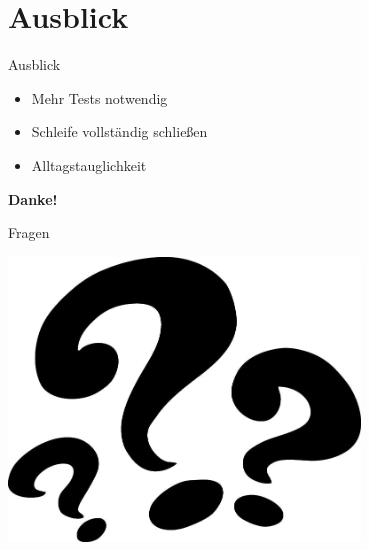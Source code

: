 \documentclass[hyperref={pdfpagelabels=false}]{beamer}
\begin{document}
\section*{Ausblick}
\begin{frame}{Ausblick}
\begin{itemize}
 \item \begin{large}Mehr Tests notwendig\end{large}
 \item \begin{large}Schleife vollständig schließen\end{large}
 \item \begin{large}Alltagstauglichkeit\end{large}
\end{itemize}
\vspace{1cm}
\end{frame}

\begin{frame}
\begin{center}
\begin{Huge}\textbf{Danke!}\end{Huge}
\end{center}
\end{frame}


\begin{frame}{Fragen}
\begin{center}
\includegraphics[width=0.7\textwidth]{./images/question-marks.png}
\end{center}
\end{frame}
\end{document}
